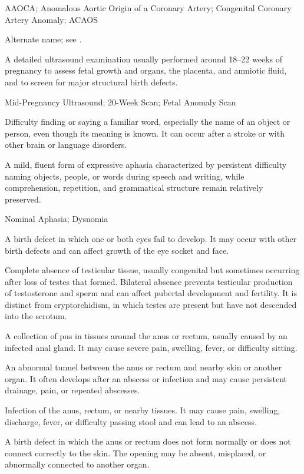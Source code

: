 \synonyms
AAOCA; Anomalous Aortic Origin of a Coronary Artery; Congenital Coronary Artery Anomaly; ACAOS

 Alternate name; see .

 A detailed ultrasound examination usually performed around 18–22 weeks of pregnancy to assess fetal growth and organs, the placenta, and amniotic fluid, and to screen for major structural birth defects.

\synonyms
Mid-Pregnancy Ultrasound; 20-Week Scan; Fetal Anomaly Scan

 Difficulty finding or saying a familiar word, especially the name of an object or person, even though its meaning is known. It can occur after a stroke or with other brain or language disorders.

 A mild, fluent form of expressive aphasia characterized by persistent difficulty naming objects, people, or words during speech and writing, while comprehension, repetition, and grammatical structure remain relatively preserved.

\synonyms
Nominal Aphasia; Dysnomia

 A birth defect in which one or both eyes fail to develop. It may occur with other birth defects and can affect growth of the eye socket and face.

 Complete absence of testicular tissue, usually congenital but sometimes
occurring after loss of testes that formed. Bilateral absence prevents testicular production
of testosterone and sperm and can affect pubertal development and fertility. It is distinct
from cryptorchidism, in which testes are present but have not descended into the scrotum.

 A collection of pus in tissues around the anus or rectum, usually caused by an infected anal gland. It may cause severe pain, swelling, fever, or difficulty sitting.

 An abnormal tunnel between the anus or rectum and nearby skin or another organ. It often develops after an abscess or infection and may cause persistent drainage, pain, or repeated abscesses.

 Infection of the anus, rectum, or nearby tissues. It may cause pain, swelling, discharge, fever, or difficulty passing stool and can lead to an abscess.

 A birth defect in which the anus or rectum does not form normally or does not connect correctly to the skin. The opening may be absent, misplaced, or abnormally connected to another organ.

